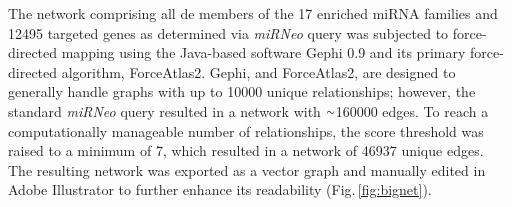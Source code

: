 \begin{method}

The network comprising all \ac{de} members of the 17 enriched miRNA families and \num{12495} targeted genes as determined via \textit{miRNeo} query was subjected to force-directed mapping using the Java-based software Gephi 0.9 and its primary force-directed algorithm, ForceAtlas2.\cite{Jacomy2014} Gephi, and ForceAtlas2, are designed to generally handle graphs with up to \num{10000} unique relationships; however, the standard \textit{miRNeo} query resulted in a network with $\smallsim$\num{160000} edges. To reach a computationally manageable number of relationships, the score threshold was raised to a minimum of 7, which resulted in a network of \num{46937} unique edges. The resulting network was exported as a vector graph and manually edited in Adobe Illustrator to further enhance its readability (Fig.\,\ref{fig:bignet}).

\end{method}

